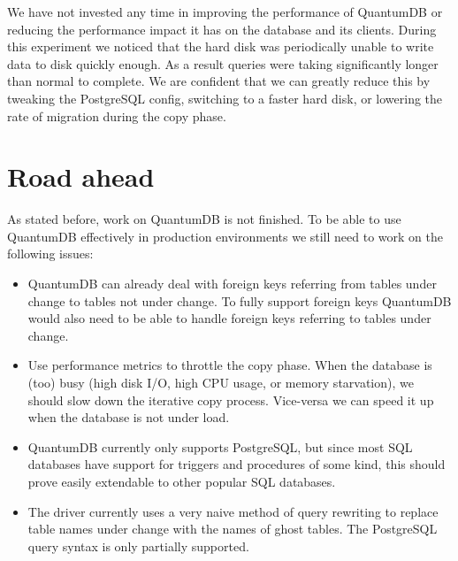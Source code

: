\documentclass[conference]{IEEEtran}
\begin{document}
We have not invested any time in improving the performance of QuantumDB or reducing the performance impact it has on the database and its clients. During this experiment we noticed that the hard disk was periodically unable to write data to disk quickly enough. As a result queries were taking significantly longer than normal to complete. We are confident that we can greatly reduce this by tweaking the PostgreSQL config, switching to a faster hard disk, or lowering the rate of migration during the copy phase.

\section{Road ahead}
As stated before, work on QuantumDB is not finished. To be able to use QuantumDB effectively in production environments we still need to work on the following issues: 

\begin{itemize}
  \item{QuantumDB can already deal with foreign keys referring from tables under change to tables not under change. To fully support foreign keys QuantumDB would also need to be able to handle foreign keys referring to tables under change.}
  \item{Use performance metrics to throttle the copy phase. When the database is (too) busy (high disk I/O, high CPU usage, or memory starvation), we should slow down the iterative copy process. Vice-versa we can speed it up when the database is not under load.}
  \item{QuantumDB currently only supports PostgreSQL, but since most SQL databases have support for triggers and procedures of some kind, this should prove easily extendable to other popular SQL databases.}
  \item{The driver currently uses a very naive method of query rewriting to replace table names under change with the names of ghost tables. The PostgreSQL query syntax is only partially supported.}
\end{itemize}



%
%
\end{document}

